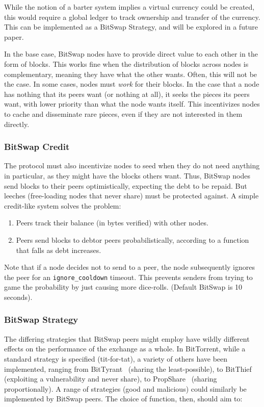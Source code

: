 \documentclass{sig-alternate}
\begin{document}
While the notion of a barter system implies a virtual currency could be
created, this would require a global ledger to track ownership
and transfer of the currency. This can be implemented as a BitSwap Strategy, and will be explored in a future paper.

In the base case, BitSwap nodes have to provide direct value to each other
in the form of blocks. This works fine when the distribution of blocks across
nodes is complementary, meaning they have what the other wants. Often, this
will not be the case. In some cases, nodes must \textit{work} for their
blocks. In the case that a node has nothing that its peers want (or
nothing at all), it seeks the pieces its peers want, with lower
priority than what the node wants itself. This incentivizes nodes to cache and
disseminate rare pieces, even if they are not interested in them directly.

\subsubsection{BitSwap Credit}

The protocol must also incentivize nodes to seed when they do not need
anything in particular, as they might have the blocks others want. Thus,
BitSwap nodes send blocks to their peers optimistically, expecting the debt to
be repaid. But leeches (free-loading nodes that never share) must be protected against. A simple credit-like system solves the problem:

\begin{enumerate}
  \item Peers track their balance (in bytes verified) with other nodes.
  \item Peers send blocks to debtor peers probabilistically, according to
        a function that falls as debt increases.
\end{enumerate}

Note that if a node decides not to send to a peer, the node subsequently
ignores the peer for an \texttt{ignore\_cooldown} timeout. This prevents
senders from trying to game the probability by just causing more dice-rolls.
(Default BitSwap is 10 seconds).

\subsubsection{BitSwap Strategy}

The differing strategies that BitSwap peers might employ have wildly different effects on the performance of the exchange as a whole. In BitTorrent, while a standard strategy is specified (tit-for-tat), a variety of others have been implemented, ranging from BitTyrant~\cite{levin08} (sharing the least-possible), to BitThief~\cite{levin08} (exploiting a vulnerability and never share), to PropShare~\cite{levin08} (sharing proportionally). A range of strategies (good and malicious) could similarly be implemented by BitSwap peers. The choice of function, then, should aim to:
\end{document}

